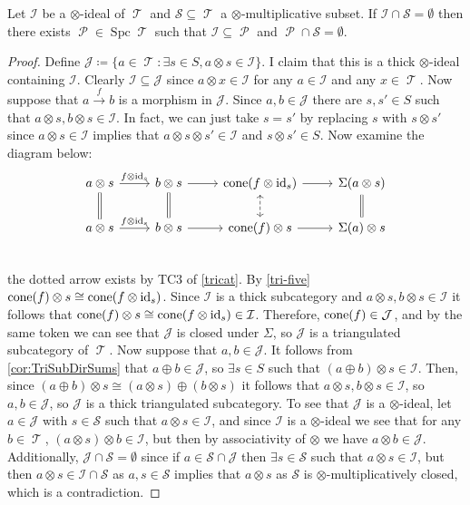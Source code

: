 \documentclass[11pt]{article}
\DeclareMathOperator{\TT}{\mathcal{T}}
\DeclareMathOperator{\cP}{\mathcal{P}}
\DeclareMathOperator{\spc}{Spc}
\begin{document}
\begin{lem}\label{lem:PrimeComplement}
Let $\mathcal{I}$ be a $\otimes$-ideal of $\TT$ and $\mathcal{S} \subseteq \TT$ a $\otimes$-multiplicative subset. If $\mathcal{I} \cap \mathcal{S} = \emptyset$ then there exists $\cP \in \spc \TT$ such that $\mathcal{I} \subseteq \cP$ and $\cP \cap \mathcal{S} = \emptyset$.
\end{lem}
\begin{proof}
Define $\mathcal{J} \coloneqq \{a \in \TT: \exists s \in S, a \otimes s \in \mathcal{I}\}$. I claim that this is a thick $\otimes$-ideal containing $\mathcal{I}$. Clearly $\mathcal{I} \subseteq \mathcal{J}$ since $a \otimes x \in \mathcal{I}$ for any $a \in \mathcal{I}$ and any $x \in \TT$. Now suppose that $a \xrightarrow{f} b$ is a morphism in $\mathcal{J}$. Since $a,b \in \mathcal{J}$ there are $s,s' \in S$ such that $a \otimes s, b \otimes s \in \mathcal{I}$. In fact, we can just take $s = s'$ by replacing $s$ with $s \otimes s'$ since $a \otimes s \in \mathcal{I}$ implies that $a \otimes s \otimes s' \in \mathcal{I}$ and $s \otimes s' \in S$. Now examine the diagram below:
\[\begin{tikzcd}
a \otimes s \ar[r,"f \otimes \id_s"] \ar[d,equal] & b \otimes s \ar[d,equal] \ar[r] & \cone(f \otimes \id_s) \ar[r] \ar[d,dashed,leftrightarrow] & \Sigma(a \otimes s) \ar[d, equal]\\
 a \otimes s \ar[r,"f \otimes \id_s"]& b \otimes s \ar[r] & \cone(f) \otimes s \ar[r] &  \Sigma(a) \otimes s \\
\end{tikzcd}\]
the dotted arrow exists by TC3 of \autoref{tricat}. By \autoref{tri-five} $\operatorname{cone}(f) \otimes s \cong \operatorname{cone}(f \otimes \operatorname{id}_s)$. Since $\mathcal{I}$ is a thick subcategory and $a \otimes s, b \otimes s \in \mathcal{I}$ it follows that $\operatorname{cone}(f) \otimes s \cong \operatorname{cone}(f \otimes \operatorname{id}_s) \in \mathcal{I}$. Therefore, $\operatorname{cone}(f) \in \mathcal{J}$, and by the same token we can see that $\mathcal{J}$ is closed under $\Sigma$, so $\mathcal{J}$ is a triangulated subcategory of $\TT$. Now suppose that $a,b \in \mathcal{J} $. It follows from \autoref{cor:TriSubDirSums} that $a \oplus b \in \mathcal{J}$, so $\exists s \in S $ such that $(a \oplus b) \otimes s \in \mathcal{I}$. Then, since $(a \oplus b) \otimes s \cong (a \otimes s) \oplus (b \otimes s)$ it follows that $a \otimes s, b \otimes s \in \mathcal{I}$, so $a,b \in \mathcal{J}$, so $\mathcal{J}$ is a thick triangulated subcategory. To see that $\mathcal{J}$ is a $\otimes$-ideal, let $a \in \mathcal{J}$ with $s \in \mathcal{S}$ such that $a \otimes s \in \mathcal{I}$, and since $\mathcal{I}$ is a $\otimes$-ideal we see that for any $b \in \TT$, $(a \otimes s) \otimes b \in \mathcal{I}$, but then by associativity of $\otimes$ we have $a \otimes b \in \mathcal{J}$. Additionally, $\mathcal{J} \cap \mathcal{S} = \emptyset$ since if $a \in \mathcal{S} \cap \mathcal{J}$ then $\exists s \in \mathcal{S}$ such that $a \otimes s \in \mathcal{I}$, but then $a \otimes s \in \mathcal{I} \cap \mathcal{S}$ as $a,s \in \mathcal{S}$ implies that $a \otimes s$ as $\mathcal{S}$ is $\otimes$-multiplicatively closed, which is a contradiction.


\end{proof}
\end{document}
